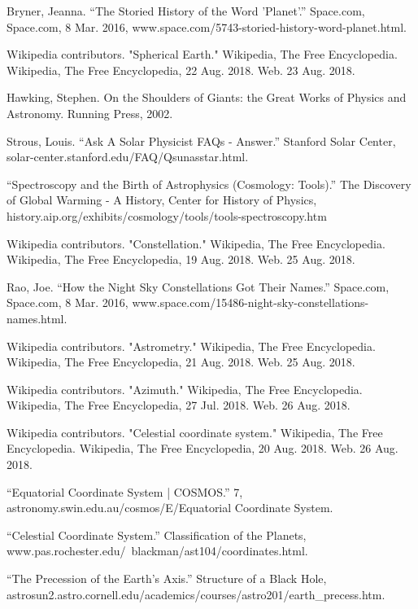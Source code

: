 \documentclass[a4paper,twoside]{article}
\numberwithin{equation}{section}
\begin{document}
\newpage
\clearpage
\begin{thebibliography}{20}
Bryner, Jeanna. “The Storied History of the Word 'Planet'.” Space.com, Space.com, 8 Mar. 2016, www.space.com/5743-storied-history-word-planet.html.

Wikipedia contributors. "Spherical Earth." Wikipedia, The Free Encyclopedia. Wikipedia, The Free Encyclopedia, 22 Aug. 2018. Web. 23 Aug. 2018.

Hawking, Stephen. On the Shoulders of Giants: the Great Works of Physics and Astronomy. Running Press, 2002.

Strous, Louis. “Ask A Solar Physicist FAQs - Answer.” Stanford Solar Center, solar-center.stanford.edu/FAQ/Qsunasstar.html.

“Spectroscopy and the Birth of Astrophysics (Cosmology: Tools).” The Discovery of Global Warming - A History, Center for History of Physics, history.aip.org/exhibits/cosmology/tools/tools-spectroscopy.htm

Wikipedia contributors. "Constellation." Wikipedia, The Free Encyclopedia. Wikipedia, The Free Encyclopedia, 19 Aug. 2018. Web. 25 Aug. 2018.

Rao, Joe. “How the Night Sky Constellations Got Their Names.” Space.com, Space.com, 8 Mar. 2016, www.space.com/15486-night-sky-constellations-names.html.

Wikipedia contributors. "Astrometry." Wikipedia, The Free Encyclopedia. Wikipedia, The Free Encyclopedia, 21 Aug. 2018. Web. 25 Aug. 2018.

Wikipedia contributors. "Azimuth." Wikipedia, The Free Encyclopedia. Wikipedia, The Free Encyclopedia, 27 Jul. 2018. Web. 26 Aug. 2018.

Wikipedia contributors. "Celestial coordinate system." Wikipedia, The Free Encyclopedia. Wikipedia, The Free Encyclopedia, 20 Aug. 2018. Web. 26 Aug. 2018.

“Equatorial Coordinate System | COSMOS.” 7, astronomy.swin.edu.au/cosmos/E/Equatorial Coordinate System.

“Celestial Coordinate System.” Classification of the Planets, \\www.pas.rochester.edu/~blackman/ast104/coordinates.html.

“The Precession of the Earth's Axis.” Structure of a Black Hole, \\astrosun2.astro.cornell.edu/academics/courses/astro201/earth\_precess.htm.


\end{thebibliography}
\end{document}
